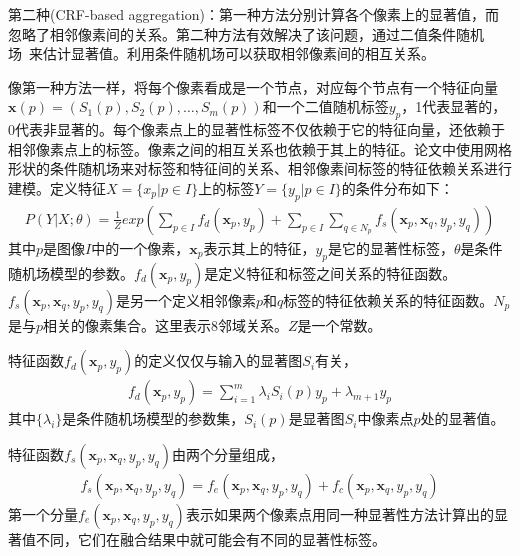 \documentclass[12pt]{article}
\begin{document}
第二种(CRF-based aggregation)：第一种方法分别计算各个像素上的显著值，而忽略了相邻像素间的关系。第二种方法有效解决了该问题，通过二值条件随机场~\cite{lafferty2001conditional}来估计显著值。利用条件随机场可以获取相邻像素间的相互关系。

像第一种方法一样，将每个像素看成是一个节点，对应每个节点有一个特征向量$\textbf{x}(p) = (S_1(p), S_2(p), \ldots, S_m(p))$和一个二值随机标签$y_p$，1代表显著的，0代表非显著的。每个像素点上的显著性标签不仅依赖于它的特征向量，还依赖于相邻像素点上的标签。像素之间的相互关系也依赖于其上的特征。论文中使用网格形状的条件随机场来对标签和特征间的关系、相邻像素间标签的特征依赖关系进行建模。定义特征$X=\{x_p|p\in I\}$上的标签$Y=\{y_p|p \in I\}$的条件分布如下：
\begin{align}
P(Y|X;\theta) = \frac{1}{Z}exp(\sum_{p\in I}f_d(\textbf{x}_p, y_p)+\sum_{p \in I}\sum_{q\in N_p}f_s(\textbf{x}_p, \textbf{x}_q, y_p, y_q))
\end{align}
其中$p$是图像$I$中的一个像素，$\textbf{x}_p$表示其上的特征，$y_p$是它的显著性标签，$\theta$是条件随机场模型的参数。$f_d(\textbf{x}_p, y_p)$是定义特征和标签之间关系的特征函数。$f_s(\textbf{x}_p, \textbf{x}_q, y_p, y_q)$是另一个定义相邻像素$p$和$q$标签的特征依赖关系的特征函数。$N_p$是与$p$相关的像素集合。这里表示8邻域关系。$Z$是一个常数。

特征函数$f_d(\textbf{x}_p, y_p)$的定义仅仅与输入的显著图$S_i$有关，
\begin{align}
f_d(\textbf{x}_p, y_p) = \sum_{i=1}^{m}\lambda_iS_i(p)y_p+\lambda_{m+1}y_p
\end{align}
其中$\{\lambda_i\}$是条件随机场模型的参数集，$S_i(p)$是显著图$S_i$中像素点$p$处的显著值。

特征函数$f_s(\textbf{x}_p, \textbf{x}_q, y_p, y_q)$由两个分量组成，
\begin{align}
f_s(\textbf{x}_p, \textbf{x}_q, y_p, y_q) = f_e(\textbf{x}_p, \textbf{x}_q, y_p, y_q)+f_c(\textbf{x}_p, \textbf{x}_q, y_p, y_q)
\end{align}
第一个分量$f_e(\textbf{x}_p, \textbf{x}_q, y_p, y_q)$表示如果两个像素点用同一种显著性方法计算出的显著值不同，它们在融合结果中就可能会有不同的显著性标签。







%


\end{document}
